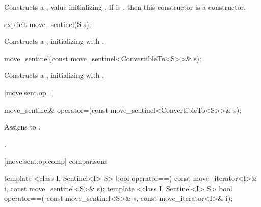 \begin{itemdescr}
\pnum
\effects Constructs a , value-initializing
. If  is , then this constructor
is a  constructor.
\end{itemdescr}

%
\begin{itemdecl}
explicit move_sentinel(S s);
\end{itemdecl}

\begin{itemdescr}
\pnum
\effects Constructs a , initializing
 with .
\end{itemdescr}

%
\begin{itemdecl}
move_sentinel(const move_sentinel<ConvertibleTo<S>>& s);
\end{itemdecl}

\begin{itemdescr}
\pnum
\effects Constructs a , initializing
 with .
\end{itemdescr}

[move.sent.op=]{}

%
%
\begin{itemdecl}
move_sentinel& operator=(const move_sentinel<ConvertibleTo<S>>& s);
\end{itemdecl}

\begin{itemdescr}
\pnum
\effects Assigns  to .

\pnum
\returns {}.
\end{itemdescr}

[move.sent.op.comp]{ comparisons}

%
%
\begin{itemdecl}
template <class I, Sentinel<I> S>
  bool operator==(
    const move_iterator<I>& i, const move_sentinel<S>& s);
template <class I, Sentinel<I> S>
  bool operator==(
    const move_sentinel<S>& s, const move_iterator<I>& i);
\end{itemdecl}

